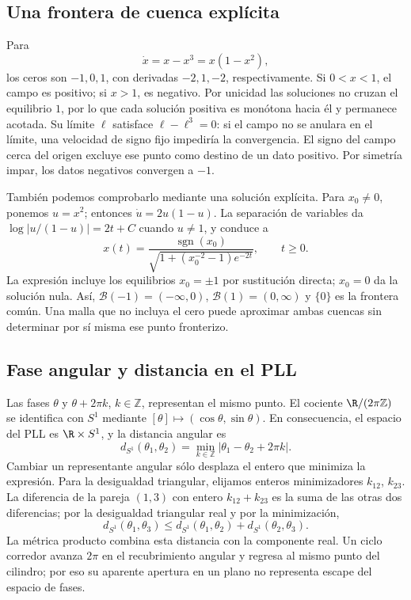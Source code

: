 \subsection{Una frontera de cuenca explícita}

Para
\begin{equation}
 \dot x=x-x^3=x(1-x^2),
 \label{eq:guide-bistable-line}
\end{equation}
los ceros son \(-1,0,1\), con derivadas \(-2,1,-2\), respectivamente.
Si \(0<x<1\), el campo es positivo; si \(x>1\), es negativo. Por
unicidad las soluciones no cruzan el equilibrio \(1\), por lo que cada
solución positiva es monótona hacia él y permanece acotada. Su límite
\(\ell\) satisface \(\ell-\ell^3=0\): si el campo no se anulara en el
límite, una velocidad de signo fijo impediría la convergencia. El signo del
campo cerca del origen excluye ese punto como destino de un dato positivo.
Por simetría impar, los datos negativos convergen a \(-1\).

También podemos comprobarlo mediante una solución explícita. Para
\(x_0\ne0\), ponemos \(u=x^2\); entonces \(\dot u=2u(1-u)\).
La separación de variables da
\(\log|u/(1-u)|=2t+C\) cuando \(u\ne1\), y conduce a
\[
 x(t)=\frac{\operatorname{sgn}(x_0)}
 {\sqrt{1+(x_0^{-2}-1)e^{-2t}}},\qquad t\ge0.
\]
La expresión incluye los equilibrios \(x_0=\pm1\) por sustitución
directa; \(x_0=0\) da la solución nula. Así,
\(\mathcal B(-1)=(-\infty,0)\), \(\mathcal B(1)=(0,\infty)\) y
\(\{0\}\) es la frontera común. Una malla que no incluya el cero puede
aproximar ambas cuencas sin determinar por sí misma ese punto fronterizo.

\subsection{Fase angular y distancia en el PLL}

Las fases \(\theta\) y \(\theta+2\pi k\), \(k\in\mathbb Z\),
representan el mismo punto. El cociente \(\R/(2\pi\mathbb Z)\) se
identifica con \(S^1\) mediante
\([\theta]\mapsto(\cos\theta,\sin\theta)\). En consecuencia, el espacio
del PLL es \(\R\times S^1\), y la distancia angular es
\begin{equation}
 d_{S^1}(\theta_1,\theta_2)
 =\min_{k\in\mathbb Z}|\theta_1-\theta_2+2\pi k|.
 \label{eq:guide-circle-distance}
\end{equation}
Cambiar un representante angular sólo desplaza el entero que minimiza la
expresión. Para la desigualdad triangular, elijamos enteros minimizadores
\(k_{12}\), \(k_{23}\). La diferencia de la pareja \((1,3)\) con entero
\(k_{12}+k_{23}\) es la suma de las otras dos diferencias; por la
desigualdad triangular real y por la minimización,
\[
 d_{S^1}(\theta_1,\theta_3)\le
 d_{S^1}(\theta_1,\theta_2)+d_{S^1}(\theta_2,\theta_3).
\]
La métrica producto combina esta distancia con la componente real. Un ciclo
corredor avanza \(2\pi\) en el recubrimiento angular y regresa al mismo
punto del cilindro; por eso su aparente apertura en un plano no representa
escape del espacio de fases.

